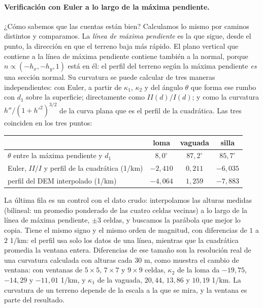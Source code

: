 \paragraph{Verificación con Euler a lo largo de la máxima pendiente.} ¿Cómo sabemos que las
cuentas están bien? Calculamos lo mismo por caminos distintos y comparamos. La \emph{línea de
máxima pendiente} es la que sigue, desde el punto, la dirección en que el terreno baja más
rápido. El plano vertical que
contiene a la línea de máxima pendiente contiene también a la normal, porque
\(n\propto(-h_x,-h_y,1)\) está en él: el perfil del terreno según la máxima pendiente
\emph{es} una sección normal. Su curvatura se puede calcular de tres maneras
independientes: con Euler, a partir de \(\kappa_1\), \(\kappa_2\) y del ángulo \(\theta\) que
forma ese rumbo con \(d_1\) sobre la superficie; directamente como \(II(d)/I(d)\); y como la
curvatura \(h''/(1+h'^2)^{3/2}\) de la curva plana que es el perfil de la cuadrática. Las tres
coinciden en los tres puntos:
\begin{center}
\begin{tabular}{lccc}
 & loma & vaguada & silla\\\hline
\(\theta\) entre la máxima pendiente y \(d_1\) & \(8{,}0^\circ\) & \(87{,}2^\circ\) & \(85{,}7^\circ\)\\
Euler, \(II/I\) y perfil de la cuadrática (1/km) & \(-2{,}410\) & \(0{,}211\) & \(-6{,}035\)\\
perfil del DEM interpolado (1/km) & \(-4{,}064\) & \(1{,}259\) & \(-7{,}883\)
\end{tabular}
\end{center}
La última fila es un control con el dato crudo: interpolamos las alturas medidas (bilineal: un
promedio ponderado de las cuatro celdas vecinas) a lo largo de
la línea de máxima pendiente, \(\pm3\) celdas, y buscamos la parábola que mejor lo copia. Tiene el mismo
signo y el mismo orden de magnitud, con diferencias de \(1\) a \(2\) 1/km: el perfil usa solo
los datos de una línea, mientras que la cuadrática promedia la ventana entera. Diferencias de
ese tamaño son la resolución real de una curvatura calculada con alturas cada \(30\) m, como
muestra el cambio de ventana: con ventanas de \(5\times5\), \(7\times7\) y \(9\times9\)
celdas, \(\kappa_2\) de la loma da \(-19{,}75\), \(-14{,}29\) y \(-11{,}01\) 1/km, y
\(\kappa_1\) de la vaguada, \(20{,}44\), \(13{,}86\) y \(10{,}19\) 1/km. La curvatura de un
terreno depende de la escala a la que se mira, y la ventana es parte del resultado.

